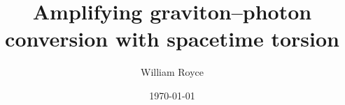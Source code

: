 \documentclass[aspectratio=169,xcolor=dvipsnames]{beamer}
\title[Amplification of the Gertsenshtein effect in PGT]%
      {Amplifying graviton--photon\\ conversion with spacetime torsion}
\author{William Royce}
\institute{Astrophysics Group, Cavendish Laboratory, University of Cambridge}
\date{\today}
\begin{document}
\begin{frame}[plain]
  \titlepage
\end{frame}



% 


% 

% 
% 



% 
\end{document}
